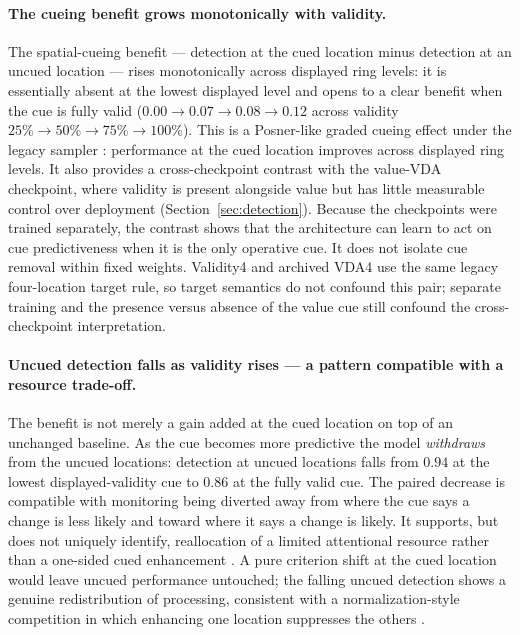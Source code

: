 \paragraph{The cueing benefit grows monotonically with validity.} The spatial-cueing
benefit --- detection at the cued location minus detection at an uncued location ---
rises monotonically across displayed ring levels: it is essentially absent
at the lowest displayed level and opens to a clear benefit when the cue is fully
valid ($0.00 \to 0.07 \to 0.08 \to 0.12$ across validity $25\% \to 50\% \to 75\%
\to 100\%$). This is a Posner-like graded cueing effect under the legacy sampler
\cite{posner1980_orienting}: performance at the cued location improves across
displayed ring levels.
It also provides a cross-checkpoint contrast with the value-VDA checkpoint, where
validity is present alongside value but has little measurable control over deployment
(Section~\ref{sec:detection}). Because the checkpoints were trained separately, the
contrast shows that the architecture can learn to act on cue predictiveness when it is
the only operative cue. It does not isolate cue removal within fixed weights. Validity4
and archived VDA4 use the same legacy four-location target rule, so target semantics do
not confound this pair; separate training and the presence versus absence of the value
cue still confound the cross-checkpoint interpretation.

\paragraph{Uncued detection falls as validity rises --- a pattern compatible with a resource trade-off.}
The benefit is not merely a gain added at the cued location on top of an unchanged
baseline. As the cue becomes more predictive the model \emph{withdraws} from the
uncued locations: detection at uncued locations falls from $0.94$ at the
lowest displayed-validity cue to $0.86$ at the fully valid cue. The paired decrease is compatible with monitoring being diverted
away from where the cue says a change is less likely and toward where it says a change
is likely. It supports, but does not uniquely identify, reallocation of a limited
attentional resource rather than a one-sided cued enhancement
\cite{posner1980_orienting, MullerFindlay1987}. A pure criterion shift at the cued
location would leave uncued performance untouched; the falling uncued detection
shows a genuine redistribution of processing, consistent with a normalization-style
competition in which enhancing one location suppresses the others
\cite{reynolds_heeger2009_normalization}.


